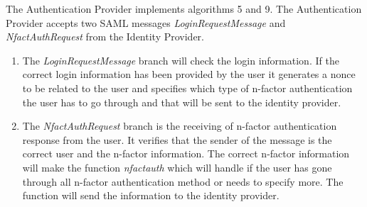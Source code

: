 \documentclass[twosided]{report}
\begin{document}
The Authentication Provider implements algorithms 5 and 9. The Authentication Provider accepts two SAML messages \emph{LoginRequestMessage} and \emph{NfactAuthRequest} from the Identity Provider.
\begin{enumerate}
\item The \emph{LoginRequestMessage} branch will check the login information. If the correct login information has been provided by the user it generates a nonce to be related to the user and specifies which type of n-factor authentication the user has to go through and that will be sent to the identity provider.
\item The \emph{NfactAuthRequest} branch is the receiving of n-factor authentication response from the user. It verifies that the sender of the message is the correct user and the n-factor information. The correct n-factor information will make the function \emph{nfactauth} which will handle if the user has gone through all n-factor authentication method or needs to specify more. The function will send the information to the identity provider.
\end{enumerate}
\end{document}
